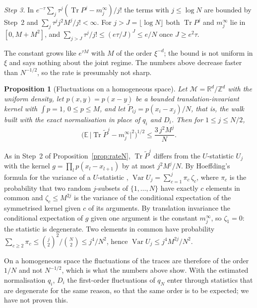 \documentclass[11pt,a4paper]{article}
\makeatletter
\theoremstyle{stmt}
\newtheorem{proposition}[theorem]{Proposition}
\theoremstyle{defn}
\theoremstyle{rmk}
\renewenvironment{proof}[1][\proofname]{\par\pushQED{\qed}\normalfont\topsep6\p@\@plus6\p@\relax
  \trivlist\item[\hskip\labelsep{\sffamily\itshape\small #1.}]\ignorespaces}{\popQED\endtrivlist\@endpefalse}
\numberwithin{equation}{section}
\DeclareMathOperator{\Tr}{Tr}
\newcommand{\M}{\mathcal{M}}
\newcommand{\R}{\mathbb{R}}
\makeatother
\begin{document}
{\begin{proof}
\emph{Step 3.} In $e^{-\tau}\sum_j\tau^j(\Tr P^j-m_j^\infty)/j!$ the terms with $j\le\log N$ are bounded by Step~2 and $\sum_j\tau^jj^2M^j/j!<\infty$. For $j>J=\lfloor\log N\rfloor$ both $\Tr P^j$ and $m_j^\infty$ lie in $[0,M+M^2]$, and $\sum_{j>J}\tau^j/j!\le(e\tau/J)^J\le e/N$ once $J\ge e^2\tau$.
\end{proof}

The constant grows like $e^{\tau M}$ with $M$ of the order $\xi^{-d}$; the bound is not uniform in $\xi$ and says nothing about the joint regime. The numbers above decrease faster than $N^{-1/2}$, so the rate is presumably not sharp.

\begin{proposition}[Fluctuations on a homogeneous space]\label{prop:oracle}
Let $\M=\R^d/\mathbb Z^d$ with the uniform density, let $p(x,y)=p(x-y)$ be a bounded translation-invariant kernel with $\int p=1$, $0\le p\le M$, and let $\tilde P_{ij}=p(x_i-x_j)/N$, that is, the walk built with the exact normalisation in place of $q_i$ and $D_i$. Then for $1\le j\le N/2$,
\[
\Big(\mathbb E\,\big|\Tr\tilde P^j-m_j^\infty\big|^2\Big)^{1/2}\le\frac{3\,j^2M^j}{N}.
\]
\end{proposition}

\begin{proof}
As in Step~2 of Proposition~\ref{prop:rateN}, $\Tr\tilde P^j$ differs from the $U$-statistic $U_j$ with the kernel $g=\prod_lp(x_l-x_{l+1})$ by at most $j^2M^j/N$. By Hoeffding's formula for the variance of a $U$-statistic \cite[Section~5.2]{Serfling}, $\operatorname{Var}U_j=\sum_{c=1}^j\pi_c\,\zeta_c$, where $\pi_c$ is the probability that two random $j$-subsets of $\{1,\dots,N\}$ have exactly $c$ elements in common and $\zeta_c\le M^{2j}$ is the variance of the conditional expectation of the symmetrised kernel given $c$ of its arguments. By translation invariance the conditional expectation of $g$ given one argument is the constant $m_j^\infty$, so $\zeta_1=0$: the statistic is degenerate. Two elements in common have probability $\sum_{c\ge2}\pi_c\le\binom j2^2/\binom N2\le j^4/N^2$, hence $\operatorname{Var}U_j\le j^4M^{2j}/N^2$.
\end{proof}

On a homogeneous space the fluctuations of the traces are therefore of the order $1/N$ and not $N^{-1/2}$, which is what the numbers above show. With the estimated normalisation $q_i$, $D_i$ the first-order fluctuations of $q_N$ enter through statistics that are degenerate for the same reason, so that the same order is to be expected; we have not proven this.

}
\end{document}
